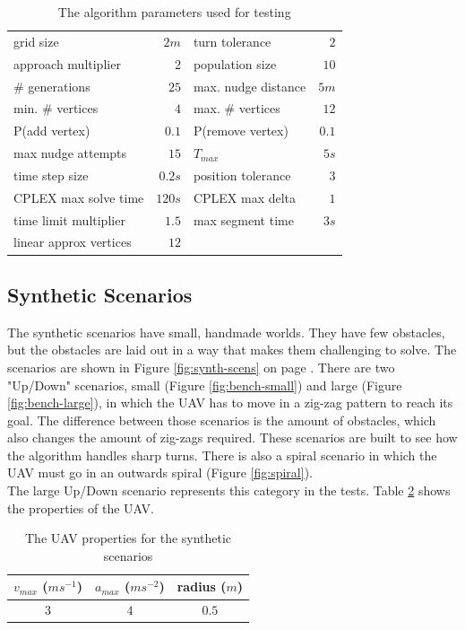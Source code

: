 \begin{table}[h]
\centering
\begin{tabular}{ l  r | l r }
grid size 			& $2m$ 	& turn tolerance 		& $2$ \\
approach multiplier & $2$ 	& population size 		& $ 10$ \\
\# generations 		& $25$ 	& max. nudge distance 	& $5m$\\
min. \# vertices 	& $ 4$ 	& max. \# vertices 		& $12$ \\
P(add vertex) 		& $0.1$ & P(remove vertex) 		& $0.1$  \\
max nudge attempts 	& $15$ 	& $ T_{max}$ 			& $5s$ \\
time step size 		& $0.2s$& position tolerance & $3$ \\
CPLEX max solve time & $120s$ & CPLEX max delta & $1$ \\
time limit multiplier & $1.5$ & max segment time & $3s$\\
linear approx vertices & $12$ & & \\
\end{tabular}
\caption{The algorithm parameters used for testing}
\label{table:params}
\end{table}
\clearpage
\subsection{Synthetic Scenarios}
\label{subsec:synth}
The synthetic scenarios have small, handmade worlds. They have few obstacles, but the obstacles are laid out in a way that makes them challenging to solve. The scenarios are shown in Figure \ref{fig:synth-scens} on page \pageref{fig:synth-scens}. There are two "Up/Down" scenarios, small (Figure \ref{fig:bench-small}) and large (Figure \ref{fig:bench-large}), in which the UAV has to move in a zig-zag pattern to reach its goal. The difference between those scenarios is the amount of obstacles, which also changes the amount of zig-zags required. These scenarios are built to see how the algorithm handles sharp turns. There is also a spiral scenario in which the UAV must go in an outwards spiral (Figure \ref{fig:spiral}).\\
The large Up/Down scenario represents this category in the tests. Table \ref{table:uav-synth} shows the properties of the UAV.

\begin{table}[h]
\centering
\begin{tabular}{ c | c | c }
$v_{max}$ ($ms^{-1}$)	& $a_{max}$ ($ms^{-2}$) 	& radius ($m$) 	 \\
\hline
$3$ & $4$ 	& $0.5$ \\
\end{tabular}
\caption{The UAV properties for the synthetic scenarios}
\label{table:uav-synth}
\end{table}

